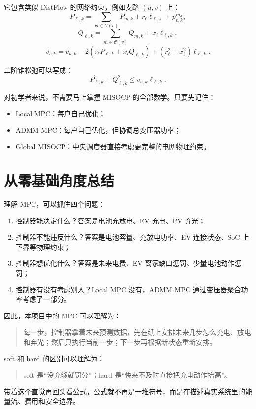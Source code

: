\documentclass[UTF8,zihao=-4]{ctexart}
\begin{document}
它包含类似 DistFlow 的网络约束，例如支路 $(u,v)$ 上：
\begin{equation}
P_{\ell,k}
=
\sum_{m\in\mathcal{C}(v)}P_{m,k}
+r_{\ell}\ell_{\ell,k}
+p^{inj}_{v,k},
\end{equation}
\begin{equation}
Q_{\ell,k}
=
\sum_{m\in\mathcal{C}(v)}Q_{m,k}
+x_{\ell}\ell_{\ell,k},
\end{equation}
\begin{equation}
v_{v,k}
=
v_{u,k}
-2(r_{\ell}P_{\ell,k}+x_{\ell}Q_{\ell,k})
+(r_{\ell}^2+x_{\ell}^2)\ell_{\ell,k}.
\end{equation}

二阶锥松弛可以写成：
\begin{equation}
P_{\ell,k}^2+Q_{\ell,k}^2
\le
v_{u,k}\ell_{\ell,k}.
\end{equation}

对初学者来说，不需要马上掌握 MISOCP 的全部数学。只要先记住：
\begin{itemize}
  \item Local MPC：每户自己优化；
  \item ADMM MPC：每户自己优化，但协调总变压器功率；
  \item Global MISOCP：中央调度器直接考虑更完整的电网物理约束。
\end{itemize}

\section{从零基础角度总结}

理解 MPC，可以抓住四个问题：
\begin{enumerate}
  \item 控制器能决定什么？答案是电池充放电、EV 充电、PV 弃光；
  \item 控制器不能违反什么？答案是电池容量、充放电功率、EV 连接状态、SoC 上下界等物理约束；
  \item 控制器想优化什么？答案是未来电费、EV 离家缺口惩罚、少量电池动作惩罚；
  \item 控制器有没有考虑别人？Local MPC 没有，ADMM MPC 通过变压器聚合功率考虑了一部分。
\end{enumerate}

因此，本项目中的 MPC 可以理解为：
\begin{quote}
每一步，控制器拿着未来预测数据，先在纸上安排未来几步怎么充电、放电和弃光；然后只执行当前一步；下一步再根据新状态重新安排。
\end{quote}

soft 和 hard 的区别可以理解为：
\begin{quote}
soft 是“没充够就罚分”；hard 是“快来不及时直接把充电动作抬高”。
\end{quote}

带着这个直觉再回头看公式，公式就不再是一堆符号，而是在描述真实系统里的能量流、费用和安全边界。
\end{document}

